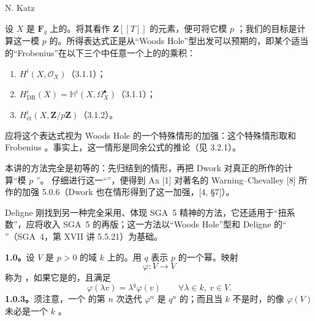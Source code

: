 \begin{center}N. Katz\end{center}
设 $X$ 是 $\mathbf F_q$ 上的。将其看作 $\mathbf Z[[T]]$ 的元素，便可将它模 $p$ ；我们的目标是计算这一模 $p$ 的。所得表达式正是从“Woods Hole”型出发可以预期的，即某个适当的“Frobenius”在以下三个中任意一个上的的乘积：
\begin{enumerate}
\item {} $H^i(X,\mathcal O_X)$（3.1.1）；
\item {} $H^i_{\mathrm{DR}}(X)=\mathbb H^i(X,\Omega_X^\bullet)$（3.1.1）；
\item {} $H^i_{\text{ét}}(X,\mathbf Z/p\mathbf Z)$（3.1.2）。
\end{enumerate}
应将这个表达式视为 Woods Hole 的一个特殊情形的加强：这个特殊情形取和 Frobenius 。事实上，这一情形是同余公式的推论（见 3.2.1）。

本讲的方法完全是初等的：先归结到的情形，再把 Dwork 对真正的所作的计算“模 $p$ ”。
仔细进行这一“”，便得到 Ax [1] 对著名的 Warning--Chevalley  [8] 所作的加强 5.0.6（Dwork 也在情形得到了这一加强，[4, \S 7]）。

Deligne 刚找到另一种完全采用、体现 SGA~5 精神的方法，它还适用于“扭系数”，应将收入 SGA~5 的再版；这一方法以“Woods Hole”型和 Deligne 的“ ”（SGA~4，第 XVII 讲 5.5.21）为基础。

\textbf{1.0。}设 $V$ 是 $p>0$ 的域 $k$ 上的。用 $q$ 表示 $p$ 的一个幂。映射
\[
\varphi:V\longrightarrow V \tag{1.0.1}
\]
称为 ，如果它是的，且满足
\[
\varphi(\lambda v)=\lambda^q\varphi(v)\qquad
\forall\lambda\in k,\ v\in V. \tag{1.0.2}
\]
\textbf{1.0.3。}须注意，一个 的第 $n$ 次迭代 $\varphi^n$ 是 $q^n$ 的；而且当 $k$ 不是时，的像 $\varphi(V)$ 未必是一个 $k$ 。

